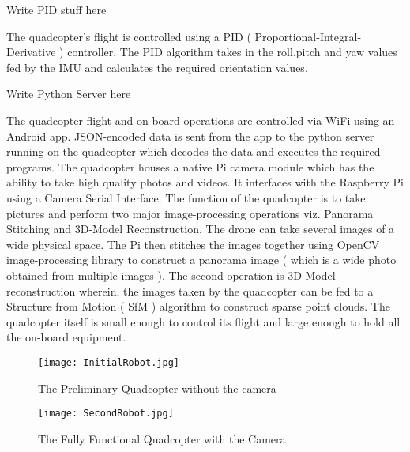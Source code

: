 Write PID stuff here

The quadcopter's flight is controlled using a PID ( Proportional-Integral-Derivative ) controller.  The PID algorithm takes in the roll,pitch and yaw values fed by the IMU and calculates the required orientation values.

Write Python Server here

The quadcopter flight and on-board operations are controlled via WiFi using an Android app. JSON-encoded data is sent from the app to the python server running on the quadcopter which decodes the data and executes the required programs.
The quadcopter houses a native Pi camera module which has the ability to take high quality photos and videos. It interfaces with the Raspberry Pi using a Camera Serial Interface. 
The function of the quadcopter is to take pictures and perform two major image-processing operations viz. Panorama Stitching and 3D-Model Reconstruction.
The drone can take several images of a wide physical space. The Pi then stitches the images together using OpenCV image-processing library to construct a panorama image ( which is a wide photo obtained from multiple images ). The second operation is 3D Model reconstruction wherein, the images taken by the quadcopter can be fed to a Structure from Motion ( SfM ) algorithm to construct sparse point clouds.
The quadcopter itself is small enough to control its flight and large enough to hold all the on-board equipment.


\begin{figure}[H]
  \centering
  \texttt{[image: InitialRobot.jpg]}
  \caption{The Preliminary Quadcopter without the camera}
  \label{first quadcopter}	
\end{figure}

\begin{figure}[H]
  \centering
  \texttt{[image: SecondRobot.jpg]}
  \caption{The Fully Functional Quadcopter with the Camera}
  \label{second quadcopter}	
\end{figure}



